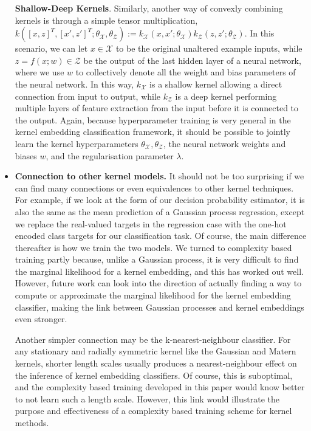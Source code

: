 \documentclass{article}
\begin{document}
\begin{itemize}
		\textbf{Shallow-Deep Kernels}. Similarly, another way of convexly combining kernels is through a simple tensor multiplication, $k([x, z]^{T}, [x', z']^{T}; \theta_{\mathcal{X}}, \theta_{\mathcal{Z}}) := k_{\mathcal{X}}(x, x'; \theta_{\mathcal{X}}) k_{\mathcal{Z}}(z, z'; \theta_{\mathcal{Z}})$. In this scenario, we can let $x \in \mathcal{X}$ to be the original unaltered example inputs, while $z = f(x; w) \in \mathcal{Z}$ be the output of the last hidden layer of a neural network, where we use $w$ to collectively denote all the weight and bias parameters of the neural network. In this way, $k_{\mathcal{X}}$ is a shallow kernel allowing a direct connection from input to output, while $k_{\mathcal{Z}}$ is a deep kernel performing multiple layers of feature extraction from the input before it is connected to the output. Again, because hyperparameter training is very general in the kernel embedding classification framework, it should be possible to jointly learn the kernel hyperparameters $\theta_{\mathcal{X}}, \theta_{\mathcal{Z}}$, the neural network weights and biases $w$, and the regularisation parameter $\lambda$.
		
		\item \textbf{Connection to other kernel models.} It should not be too surprising if we can find many connections or even equivalences to other kernel techniques. For example, if we look at the form of our decision probability estimator, it is also the same as the mean prediction of a Gaussian process regression, except we replace the real-valued targets in the regression case with the one-hot encoded class targets for our classification task. Of course, the main difference thereafter is how we train the two models. We turned to complexity based training partly because, unlike a Gaussian process, it is very difficult to find the marginal likelihood for a kernel embedding, and this has worked out well. However, future work can look into the direction of actually finding a way to compute or approximate the marginal likelihood for the kernel embedding classifier, making the link between Gaussian processes and kernel embeddings even stronger.
		
		Another simpler connection may be the k-nearest-neighbour classifier. For any stationary and radially symmetric kernel like the Gaussian and Matern kernels, shorter length scales usually produces a nearest-neighbour effect on the inference of kernel embedding classifiers. Of course, this is suboptimal, and the complexity based training developed in this paper would know better to not learn such a length scale. However, this link would illustrate the purpose and effectiveness of a complexity based training scheme for kernel methods.
		

\end{itemize}
\end{document}
